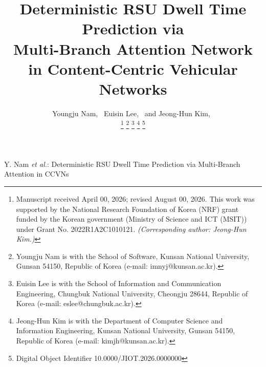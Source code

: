 \documentclass[journal]{IEEEtran}
\begin{document}
\title{Deterministic RSU Dwell Time Prediction via\\Multi-Branch Attention Network in Content-Centric Vehicular Networks}

\newcommand{\orcidauthorA}{0000-0003-3971-0715} %
\newcommand{\orcidauthorC}{0000-0002-0422-0647} %
\newcommand{\orcidauthorB}{0000-0001-8209-5944} %

\author{Youngju Nam,~
        Euisin Lee,~
        and Jeong-Hun Kim,~

\thanks{Manuscript received April 00, 2026; revised August 00, 2026.
This work was supported by the National Research Foundation of Korea (NRF) grant funded by the Korean government (Ministry of Science and ICT (MSIT)) under Grant No. 2022R1A2C1010121.
\textit{(Corresponding author: Jeong-Hun Kim.)}}
\thanks{Youngju Nam is with the School of Software, Kunsan National University,
Gunsan 54150, Republic of Korea (e-mail: imnyj@kunsan.ac.kr).}
\thanks{Euisin Lee is with the School of Information and Communication Engineering,
Chungbuk National University, Cheongju 28644, Republic of Korea (e-mail: eslee@chungbuk.ac.kr).}
\thanks{Jeong-Hun Kim is with the Department of Computer Science and Information Engineering,
Kunsan National University, Gunsan 54150, Republic of Korea (e-mail: kimjh@kunsan.ac.kr).}
\thanks{Digital Object Identifier 10.0000/JIOT.2026.0000000}}

%
{Y. Nam \MakeLowercase{\textit{et al.}}: Deterministic RSU Dwell Time Prediction via Multi-Branch Attention in CCVNs}


\maketitle
\end{document}
